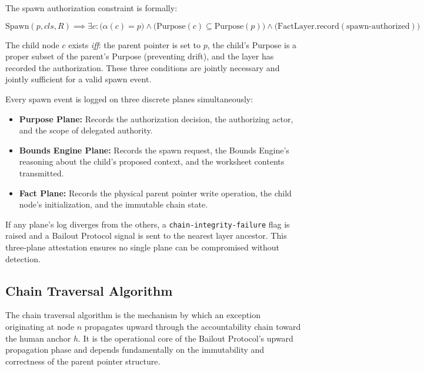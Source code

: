 The spawn authorization constraint is formally:

\begin{equation}
\text{Spawn}(p, cls, R) \implies \exists c: \bigl(\alpha(c) = p\bigr) \land \bigl(\text{Purpose}(c) \subseteq \text{Purpose}(p)\bigr) \land \bigl(\text{FactLayer.record}(\text{spawn-authorized})\bigr)
\tag{SP-1}
\end{equation}

The child node $c$ exists \emph{iff}: the parent pointer is set to $p$, the child's Purpose is a proper subset of the parent's Purpose (preventing drift), and the \fact{} layer has recorded the authorization. These three conditions are jointly necessary and jointly sufficient for a valid spawn event.

Every spawn event is logged on three discrete planes simultaneously:

\begin{itemize}
\item \textbf{Purpose Plane:} Records the authorization decision, the authorizing actor, and the scope of delegated authority.
\item \textbf{Bounds Engine Plane:} Records the spawn request, the Bounds Engine's reasoning about the child's proposed context, and the worksheet contents transmitted.
\item \textbf{Fact Plane:} Records the physical parent pointer write operation, the child node's initialization, and the immutable chain state.
\end{itemize}

If any plane's log diverges from the others, a \texttt{chain-integrity-failure} flag is raised and a Bailout Protocol signal is sent to the nearest \purpose{} layer ancestor. This three-plane attestation ensures no single plane can be compromised without detection.

\subsection{Chain Traversal Algorithm}

The chain traversal algorithm is the mechanism by which an exception originating at node $n$ propagates upward through the accountability chain toward the human anchor $h$. It is the operational core of the Bailout Protocol's upward propagation phase and depends fundamentally on the immutability and correctness of the parent pointer structure.

